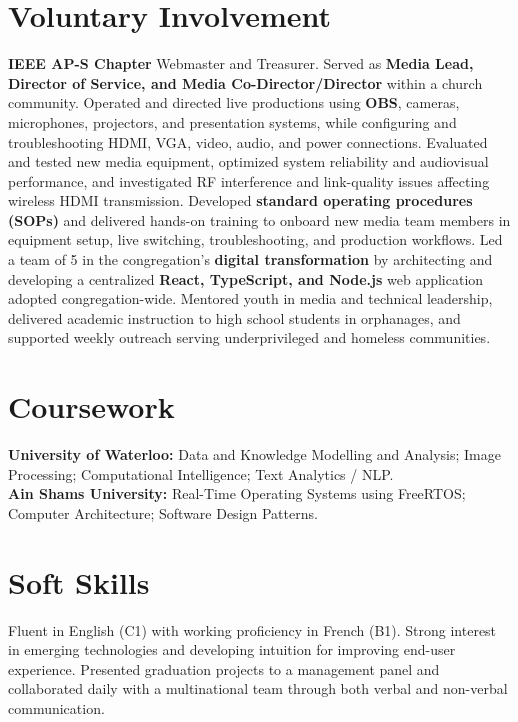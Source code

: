 \documentclass[letterpaper,11pt]{article}
\begin{document}
\section{Voluntary Involvement}
\textbf{IEEE AP-S Chapter} Webmaster and Treasurer. Served as \textbf{Media Lead, Director of Service, and Media Co-Director/Director} within a church community. Operated and directed live productions using \textbf{OBS}, cameras, microphones, projectors, and presentation systems, while configuring and troubleshooting HDMI, VGA, video, audio, and power connections. Evaluated and tested new media equipment, optimized system reliability and audiovisual performance, and investigated RF interference and link-quality issues affecting wireless HDMI transmission. Developed \textbf{standard operating procedures (SOPs)} and delivered hands-on training to onboard new media team members in equipment setup, live switching, troubleshooting, and production workflows. Led a team of 5 in the congregation’s \textbf{digital transformation} by architecting and developing a centralized \textbf{React, TypeScript, and Node.js} web application adopted congregation-wide. Mentored youth in media and technical leadership, delivered academic instruction to high school students in orphanages, and supported weekly outreach serving underprivileged and homeless communities.




\section{Coursework}
\textbf{University of Waterloo:} Data and Knowledge Modelling and Analysis; Image Processing; Computational Intelligence; Text Analytics / NLP. \\
\textbf{Ain Shams University:} Real-Time Operating Systems using FreeRTOS; Computer Architecture; Software Design Patterns.


\section{Soft Skills}
Fluent in English (C1) with working proficiency in French (B1). Strong interest in emerging technologies and developing intuition for improving end-user experience. Presented graduation projects to a management panel and collaborated daily with a multinational team through both verbal and non-verbal communication.
\end{document}
